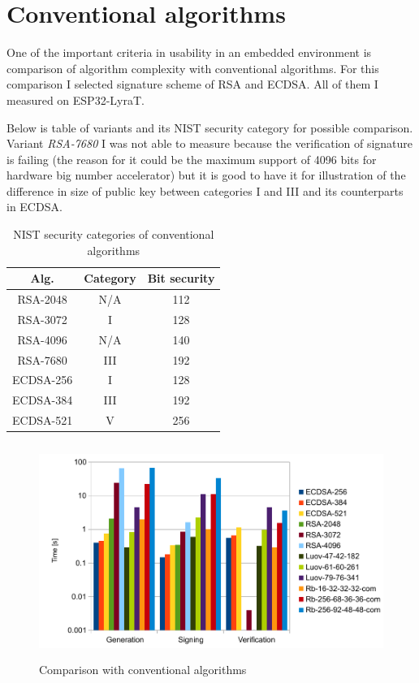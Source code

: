 \documentclass[thesis=M,english]{FITthesis}[2019/12/23]
\begin{document}
\section{Conventional algorithms}
One of the important criteria in usability in an embedded environment is comparison of algorithm complexity with conventional algorithms. For this comparison I selected signature scheme of RSA and ECDSA. All of them I measured on ESP32-LyraT.

\bigskip
\noindent
Below is table of variants and its NIST security category for possible comparison. \cite{L-NIST-RECOMM} Variant \textit{RSA-7680} I was not able to measure because the verification of signature is failing (the reason for it could be the maximum support of 4096 bits for hardware big number accelerator) but it is good to have it for illustration of the difference in size of public key between categories I and III and its counterparts in ECDSA.
\begin{table}[H]
\centering
\begin{tabular}{|c|c|c|}
\hline
Alg. & Category & Bit security \\ \hline
RSA-2048 & N/A & 112 \\ \hline
RSA-3072 & I & 128 \\ \hline
RSA-4096 & N/A & 140 \\ \hline
RSA-7680 & III & 192 \\ \hline
ECDSA-256 & I & 128 \\ \hline
ECDSA-384 & III & 192 \\ \hline
ECDSA-521 & V & 256 \\ \hline
\end{tabular}
\caption{NIST security categories of conventional algorithms}
\end{table}

\begin{figure}[H]
\centering
\includegraphics[width=13cm,height=7cm]{images/time-all.pdf}
\caption{Comparison with conventional algorithms}
\label{time-all}
\end{figure}
\end{document}
